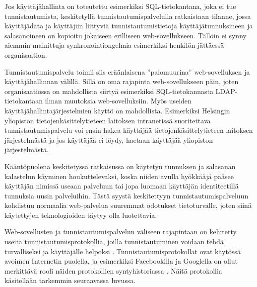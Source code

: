 Jos käyttäjähallinta on toteutettu esimerkiksi SQL-tietokantana, joka ei tue tunnistautumista, keskitetyllä tunnistautumispalvelulla ratkaistaan tilanne, jossa käyttäjädata ja käyttäjiin liittyviä tunnistautumistietoja käyttäjätunnuksineen ja salasanoineen on kopioitu jokaiseen erilliseen web-sovellukseen. Tällöin ei synny aiemmin mainittuja synkronointiongelmia esimerkiksi henkilön jättäessä organisaation.

Tunnistautumispalvelu toimii siis eräänlaisena ''palomuurina'' web-sovelluksen ja käyttäjähallinnan välillä. Sillä on oma rajapinta web-sovellukseen päin, joten organisaatiossa on mahdollista siirtyä esimerkiksi SQL-tietokannasta LDAP-tietokantaan ilman muutoksia web-sovelluksiin. Myös useiden käyttäjähallintajärjestelmien käyttö on mahdollista. Esimerkiksi Helsingin yliopiston tietojenkäsittelytieteen laitoksen intranetissä suoritettava tunnistautumispalvelu voi ensin hakea käyttäjää tietojenkäsittelytieteen laitoksen järjestelmästä ja jos käyttäjää ei löydy, haetaan käyttäjää yliopiston järjestelmästä.

Kääntöpuolena keskitetyssä ratkaisussa on käytetyn tunnuksen ja salasanan kalastelun käyminen houkuttelevaksi, koska niiden avulla hyökkääjä pääsee käyttäjän nimissä useaan palveluun tai jopa luomaan käyttäjän identiteetillä tunnuksia uusin palveluihin. Tästä syystä keskitettyyn tunnistautumispalveluun kohdistuu normaalia web-palvelua suuremmat odotukset tietoturvalle, joten siinä käytettyjen teknologioiden täytyy olla luotettavia.

Web-sovellusten ja tunnistautumispalvelun väliseen rajapintaan on kehitetty useita tunnistautumisprotokollia, joilla tunnistautuminen voidaan tehdä turvalliseksi ja käyttäjälle helpoksi \cite{open_identity}. Tunnistautumisprotokollat ovat käytössä avoimen Internetin puolella, ja esimerkiksi Facebookilla ja Googlella on ollut merkittävä rooli näiden protokollien syntyhistoriassa \cite{open_identity}. Näitä protokollia käsitellään tarkemmin seuraavassa luvussa.